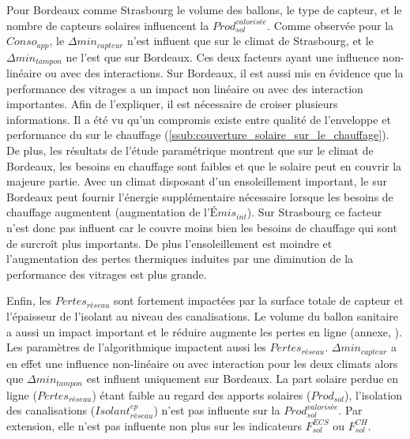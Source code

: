 Pour Bordeaux comme Strasbourg le volume des
ballons, le type de capteur, et le nombre de capteurs solaires influencent la
$Prod_{sol}^{valorisée}$. Comme observée pour la $Conso_{app}$, le $\Delta min_{capteur}$
n’est influent que sur le climat de Strasbourg, et le $\Delta min_{tampon}$ ne l’est que
sur Bordeaux. Ces deux facteurs ayant une influence non-linéaire ou avec des interactions.
Sur Bordeaux, il est aussi mis en évidence que la performance des vitrages a un impact non
linéaire ou avec des interaction importantes. Afin de l’expliquer, il est nécessaire de
croiser plusieurs informations. Il a été vu qu’un compromis existe entre qualité de
l’enveloppe et performance du  sur le chauffage
(\ref{ssub:couverture_solaire_sur_le_chauffage}). De plus, les résultats de l’étude
paramétrique montrent que sur le climat de Bordeaux, les besoins en chauffage sont faibles
et que le solaire peut en couvrir la majeure partie. Avec un climat disposant d’un
ensoleillement important, le  sur Bordeaux peut fournir l’énergie supplémentaire
nécessaire lorsque les besoins de chauffage augmentent (augmentation de l’$Émis_{int}$). Sur
Strasbourg ce facteur n’est donc pas influent car le  couvre moins bien les
besoins de chauffage qui sont de surcroît plus importants. De plus l’ensoleillement est
moindre et l’augmentation des pertes thermiques induites par une diminution de la
performance des vitrages est plus grande.

Enfin, les $Pertes_{réseau}$ sont fortement impactées par la surface totale de capteur et
l’épaisseur de l’isolant au niveau des canalisations. Le volume du ballon sanitaire a
aussi un impact important et le réduire augmente les pertes en ligne (annexe, ).
Les paramètres de l’algorithmique impactent
aussi les $Pertes_{réseau}$. $\Delta min_{capteur}$ a en effet une influence non-linéaire
ou avec interaction pour les deux climats alors que $\Delta min_{tampon}$ est influent
uniquement sur Bordeaux. La part solaire perdue en ligne ($Pertes_{réseau}$) étant faible
au regard des apports solaires ($Prod_{sol}$), l’isolation des canalisations
($Isolant_{réseau}^{ep}$) n’est pas influente sur la $Prod_{sol}^{valorisée}$. Par
extension, elle n’est pas influente non plus sur les indicateurs $F_{sol}^{ECS}$ ou
$F_{sol}^{CH}$.



